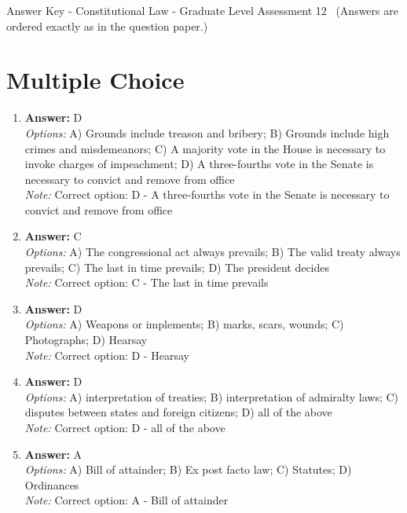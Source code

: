 \documentclass[12pt]{article}
\begin{document}
\begin{center}
Answer Key - Constitutional Law - Graduate Level Assessment 12 \
\small (Answers are ordered exactly as in the question paper.)
\end{center}

\section*{Multiple Choice}
\begin{enumerate}[label=\arabic*.]
\item \textbf{Answer:} D
\\ \textit{Options:} A) Grounds include treason and bribery; B) Grounds include high crimes and misdemeanors; C) A majority vote in the House is necessary to invoke charges of impeachment; D) A three-fourths vote in the Senate is necessary to convict and remove from office
\\ \textit{Note:} Correct option: D - A three-fourths vote in the Senate is necessary to convict and remove from office
\item \textbf{Answer:} C
\\ \textit{Options:} A) The congressional act always prevails; B) The valid treaty always prevails; C) The last in time prevails; D) The president decides
\\ \textit{Note:} Correct option: C - The last in time prevails
\item \textbf{Answer:} D
\\ \textit{Options:} A) Weapons or implements; B) marks, scars, wounds; C) Photographs; D) Hearsay
\\ \textit{Note:} Correct option: D - Hearsay
\item \textbf{Answer:} D
\\ \textit{Options:} A) interpretation of treaties; B) interpretation of admiralty laws; C) disputes between states and foreign citizens; D) all of the above
\\ \textit{Note:} Correct option: D - all of the above
\item \textbf{Answer:} A
\\ \textit{Options:} A) Bill of attainder; B) Ex post facto law; C) Statutes; D) Ordinances
\\ \textit{Note:} Correct option: A - Bill of attainder
\end{enumerate}
\end{document}
